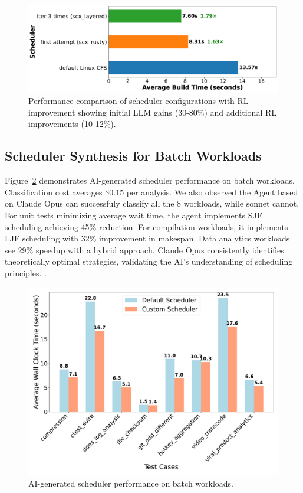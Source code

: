 \begin{figure}[h]
\centering
\includegraphics[width=0.9\columnwidth]{sections/Linux_build_benchmark_results.pdf}
\caption{Performance comparison of scheduler configurations with RL improvement showing initial LLM gains (30-80\%) and additional RL improvements (10-12\%).}
\label{fig:performance-comparison}
\end{figure}

\subsection{Scheduler Synthesis for Batch Workloads}

Figure~\ref{fig:batch-performance} demonstrates AI-generated scheduler performance on batch workloads.  Classification cost averages \$0.15 per analysis. We also observed the Agent based on Claude Opus can successfuly classify all the 8 workloads, while sonnet cannot. For unit tests minimizing average wait time, the agent implements SJF scheduling achieving 45\% reduction. For compilation workloads, it implements LJF scheduling with 32\% improvement in makespan. Data analytics workloads see 29\% speedup with a hybrid approach. Claude Opus consistently identifies theoretically optimal strategies, validating the AI's understanding of scheduling principles. .

\begin{figure}[h]
\centering
\includegraphics[width=0.9\columnwidth]{sections/scheduler_performance_comparison.pdf}
\caption{AI-generated scheduler performance on batch workloads.}
\label{fig:batch-performance}
\end{figure}

